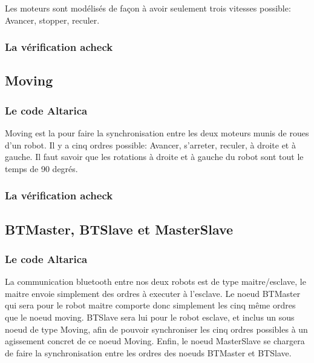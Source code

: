   Les moteurs sont modélisés de façon à avoir seulement trois vitesses possible: Avancer, stopper, reculer.

  \subsubsection{La vérification acheck}

  \subsection{Moving}
  \subsubsection{Le code Altarica}
  

  Moving est la pour faire la synchronisation entre les deux moteurs munis de roues d'un robot. Il y a cinq ordres possible: Avancer, s'arreter, reculer, à droite et à gauche. Il faut savoir que les rotations à droite et à gauche du robot sont tout le temps de 90 degrés.

  \subsubsection{La vérification acheck}

 
  \subsection{BTMaster, BTSlave et MasterSlave}

  \subsubsection{Le code Altarica}
  

  

  

  La communication bluetooth entre nos deux robots est de type maitre/esclave, le maitre envoie simplement des ordres à executer à l'esclave. Le noeud BTMaster qui sera pour le robot maitre comporte donc simplement les cinq même ordres que le noeud moving. BTSlave sera lui pour le robot esclave, et inclus un sous noeud de type Moving, afin de pouvoir synchroniser les cinq ordres possibles à un agissement concret de ce noeud Moving. Enfin, le noeud MasterSlave se chargera de faire la synchronisation entre les ordres des noeuds BTMaster et BTSlave.
